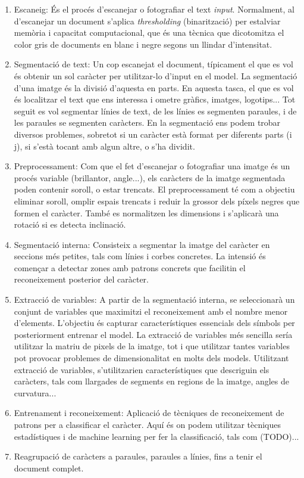 \documentclass[12pt, spanish]{article}
\begin{document}
\begin{enumerate}
\item Escaneig: És el procés d'escanejar o fotografiar el text \textit{input}. Normalment, al d'escanejar un document s'aplica \textit{thresholding} (binarització) per estalviar memòria i capacitat computacional, que és una tècnica que dicotomitza el color gris de documents en blanc i negre segons un llindar d'intensitat.

\item Segmentació de text: Un cop escanejat el document, típicament el que es vol és obtenir un sol caràcter per utilitzar-lo d'input en el model. La segmentació d'una imatge és la divisió d'aquesta en parts. En aquesta tasca, el que es vol és localitzar el text que ens interessa i ometre gràfics, imatges, logotips... Tot seguit es vol segmentar línies de text, de les línies es segmenten paraules, i de les paraules se segmenten caràcters. En la segmentació ens podem trobar diversos problemes, sobretot si un caràcter està format per diferents parts (i j), si s'està tocant amb algun altre, o s'ha dividit.

\item Preprocessament: Com que el fet d'escanejar o fotografiar una imatge és un procés variable (brillantor, angle...), els caràcters de la imatge segmentada poden contenir soroll, o estar trencats. El preprocessament té com a objectiu eliminar soroll, omplir espais trencats i reduir la grossor dels píxels negres que formen el caràcter. També es normalitzen les dimensions i s'aplicarà una rotació si es detecta inclinació.

\item Segmentació interna: Consisteix a segmentar la imatge del caràcter en seccions més petites, tals com línies i corbes concretes. La intensió és començar a detectar zones amb patrons concrets que facilitin el reconeixement posterior del caràcter.

\item Extracció de variables: A partir de la segmentació interna, se seleccionarà un conjunt de variables que maximitzi el reconeixement amb el nombre menor d'elements. L'objectiu és capturar característiques essencials dels símbols per posteriorment entrenar el model. La extracció de variables més sencilla sería utilitzar la matriu de pixels de la imatge, tot i que utilitzar tantes variables pot provocar problemes de dimensionalitat en molts dels models. Utilitzant extracció de variables, s'utilitzarien característiques que descriguin els caràcters, tals com llargades de segments en regions de la imatge, angles de curvatura...

\item Entrenament i reconeixement: Aplicació de tècniques de reconeixement de patrons per a classificar el caràcter. Aquí és on podem utilitzar tècniques estadístiques i de machine learning per fer la classificació, tals com (TODO)...

\item Reagrupació de caràcters a paraules, paraules a línies, fins a tenir el document complet.
\end{enumerate}
\end{document}
